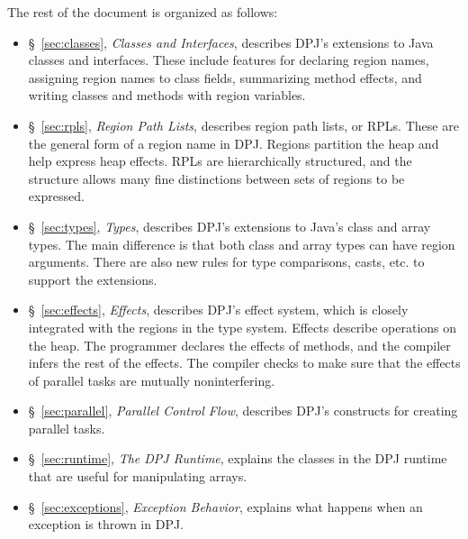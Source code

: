 The rest of the document is organized as follows:
%
\begin{itemize}
%
\item \S~\ref{sec:classes}, \emph{Classes and Interfaces}, describes
  DPJ's extensions to Java classes and interfaces.  These include
  features for declaring region names, assigning region names to class
  fields, summarizing method effects, and writing classes and methods
  with region variables.
%
\item \S~\ref{sec:rpls}, \emph{Region Path Lists}, describes region
  path lists, or RPLs.  These are the general form of a region name in
  DPJ.  Regions partition the heap and help express heap effects.
  RPLs are hierarchically structured, and the structure allows many
  fine distinctions between sets of regions to be expressed.
%
\item \S~\ref{sec:types}, \emph{Types}, describes DPJ's extensions to
  Java's class and array types.  The main difference is that both
  class and array types can have region arguments.  There are also new
  rules for type comparisons, casts, etc. to support the extensions.
%
\item \S~\ref{sec:effects}, \emph{Effects}, describes DPJ's effect
  system, which is closely integrated with the regions in the type
  system.  Effects describe operations on the heap.  The programmer
  declares the effects of methods, and the compiler infers the rest of
  the effects.  The compiler checks to make sure that the effects of
  parallel tasks are mutually noninterfering.
%
\item \S~\ref{sec:parallel}, \emph{Parallel Control Flow}, describes
  DPJ's constructs for creating parallel tasks.
%
\item \S~\ref{sec:runtime}, \emph{The DPJ Runtime}, explains the classes in
  the DPJ runtime that are useful for manipulating arrays.
%
\item \S~\ref{sec:exceptions}, \emph{Exception Behavior}, explains
  what happens when an exception is thrown in DPJ.
%
\end{itemize}


